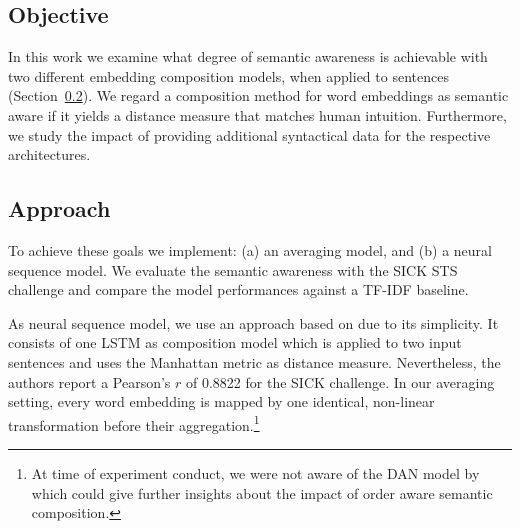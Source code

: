 
\subsection{Objective}
In this work we examine what degree of semantic awareness is achievable with two different embedding composition models, when applied to sentences (Section~\ref{sec:approach}).
We regard a composition method for word embeddings as semantic aware if it yields a distance measure that matches human intuition. Furthermore, we study the impact of providing additional syntactical data for the respective architectures.

\subsection{Approach}
\label{sec:approach}
To achieve these goals we implement: (a) an averaging model, and (b) a neural sequence model. We evaluate the semantic awareness with the SICK \ac{STS} challenge \autocite{marelli_sick_2014} and compare the model performances against a \acs{TF-IDF} baseline.



As neural sequence model, we use an approach based on \Textcite{mueller_siamese_2016} due to its simplicity. It consists of one LSTM as composition model which is applied to two input sentences and uses the Manhattan metric as distance measure. Nevertheless, the authors report a Pearson's $r$ of 0.8822 for the SICK challenge. In our averaging setting, every word embedding is mapped by one identical, non-linear transformation before their aggregation.\footnote{At time of experiment conduct, we were not aware of the \acl{DAN} model by \textcite{iyyer_deep_2015} which could give further insights about the impact of order aware semantic composition.}


